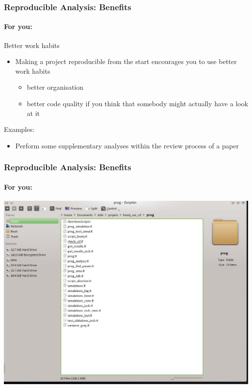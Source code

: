 \documentclass[paper=screen,mathserif]{beamer}\usepackage[]{graphicx}\usepackage[]{color}
\begin{document}
\begin{frame}
  \frametitle{Reproducible Analysis: Benefits}
  \framesubtitle{For you:}
  Better work habits
  \begin{itemize}
  \item Making a project reproducible from the start encourages you to
    use better work habits
    \begin{itemize}
    \item better organisation
    \item better code quality if you think that somebody might
      actually have a look at it 
    \end{itemize}
  \end{itemize}
  Examples:
  \begin{itemize}
  \item Perform some supplementary analyses within the review process
    of a paper
  \end{itemize}
\end{frame}

\begin{frame}
  \frametitle{Reproducible Analysis: Benefits}
  \framesubtitle{For you:}
  \begin{center}
    \includegraphics[width = \linewidth]{graphics/folders.jpeg}
  \end{center}
\end{frame}
\end{document}
